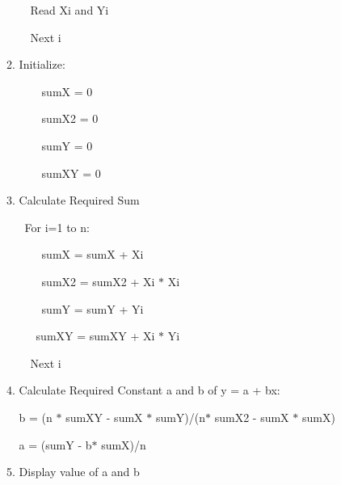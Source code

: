 \documentclass[12pt]{article}
\renewcommand{\_}{\kern-1.5pt\textunderscore\kern-1.5pt}
\begin{document}
\begin{enumerate}
\begin{enumerate}
\textcolor[HTML]{222222}{\ \  Read Xi and Yi}\par

\textcolor[HTML]{222222}{\ \  Next i}\par

	\item \textcolor[HTML]{222222}{Initialize:}\par

\textcolor[HTML]{222222}{\ \ \ \  \tab sumX = 0}\par

\textcolor[HTML]{222222}{\ \ \ \  \tab sumX2 = 0}\par

\textcolor[HTML]{222222}{\ \ \ \  \tab sumY = 0}\par

\textcolor[HTML]{222222}{\ \ \ \  \tab sumXY = 0}\par

	\item \textcolor[HTML]{222222}{Calculate Required Sum}\par

\textcolor[HTML]{222222}{\  \tab  For i=1 to n:}\par

\textcolor[HTML]{222222}{\ \ \ \  \tab  \tab sumX = sumX + Xi}\par

\textcolor[HTML]{222222}{\ \ \ \  \tab \tab sumX2 = sumX2 + Xi $\ast$  Xi}\par

\textcolor[HTML]{222222}{\ \ \ \  \tab \tab sumY = sumY + Yi}\par

\textcolor[HTML]{222222}{\ \ \  \tab \tab  sumXY = sumXY + Xi $\ast$  Yi}\par

\textcolor[HTML]{222222}{\ \  \tab \tab Next i}\par

	\item \textcolor[HTML]{222222}{Calculate Required Constant a and b of y = a + bx:}\par

\textcolor[HTML]{222222}{b = (n $\ast$  sumXY - sumX $\ast$  sumY)/(n$\ast$ sumX2 - sumX $\ast$  sumX)}\par

\textcolor[HTML]{222222}{a = (sumY - b$\ast$ sumX)/n}\par


\vspace{\baselineskip}
	\item \textcolor[HTML]{222222}{Display value of a and b}
\end{enumerate}\par



\end{enumerate}
\end{document}
